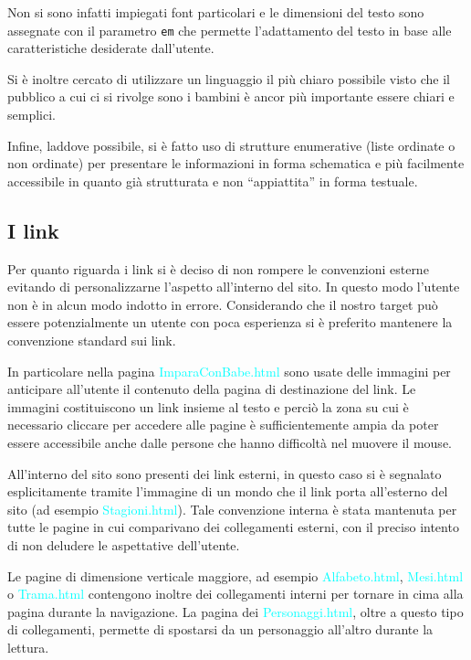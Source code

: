 \documentclass[10pt,a4paper,onecolumn]{article}
\newcommand{\sitepage}[1]{\textcolor{cyan}{\textsf{#1}}}
\begin{document}
Non si sono infatti impiegati font particolari e le dimensioni del testo sono assegnate con il parametro \texttt{em} che permette l'adattamento del testo in base alle caratteristiche desiderate dall'utente.  

Si è inoltre cercato di utilizzare un linguaggio il più chiaro possibile visto che il pubblico a cui ci si rivolge sono i bambini è ancor più importante essere chiari e semplici.

Infine, laddove possibile, si è fatto uso di strutture enumerative (liste ordinate o non ordinate) per presentare le informazioni in forma schematica e più facilmente accessibile in quanto già strutturata e non ``appiattita'' in forma testuale.

\subsection{I link}
Per quanto riguarda i link si è deciso di non rompere le convenzioni esterne evitando di personalizzarne l'aspetto all'interno del sito.
In questo modo l'utente non è in alcun modo indotto in errore. Considerando che il nostro target può essere potenzialmente un utente con poca esperienza si è preferito mantenere la convenzione standard sui link.

In particolare nella pagina \sitepage{ImparaConBabe.html} sono usate delle immagini per anticipare all'utente il contenuto della pagina di destinazione del link.
Le immagini costituiscono un link insieme al testo  e perciò la zona su cui è necessario cliccare per accedere alle pagine è sufficientemente ampia da poter essere accessibile anche dalle persone che hanno difficoltà nel muovere il mouse.

All'interno del sito sono presenti dei link esterni, in questo caso si è segnalato esplicitamente tramite l'immagine di un mondo che il link porta all'esterno del sito (ad esempio \sitepage{Stagioni.html}). Tale convenzione interna è stata mantenuta per tutte le pagine in cui comparivano dei collegamenti esterni, con il preciso intento di non deludere le aspettative dell'utente.

Le pagine di dimensione verticale maggiore, ad esempio \sitepage{Alfabeto.html}, \sitepage{Mesi.html} o \sitepage{Trama.html} contengono inoltre dei collegamenti interni per tornare in cima alla pagina durante la navigazione. La pagina dei \sitepage{Personaggi.html}, oltre a questo tipo di collegamenti, permette di spostarsi da un personaggio all'altro durante la lettura.
\end{document}

